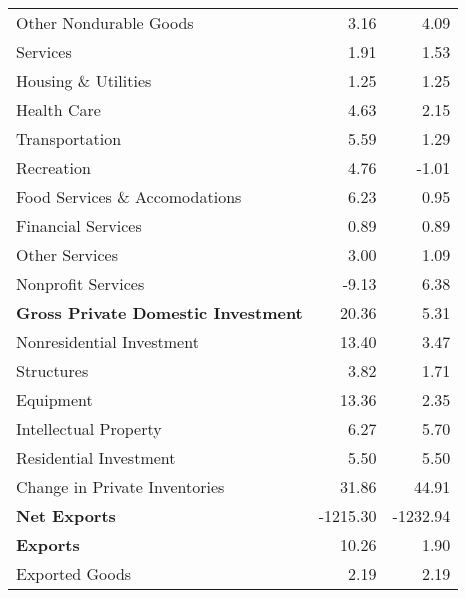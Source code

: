 \documentclass[11pt, letterpaper]{article}\usepackage[]{graphicx}\usepackage[]{color}
\begin{document}
\begin{table}[H]
\begin{tabular}{lrr}
  \hspace{24mm}  Other Nondurable Goods & 3.16 & 4.09 \\ 
  \hspace{8mm}  Services & 1.91 & 1.53 \\ 
  \hspace{16mm}  Housing \& Utilities & 1.25 & 1.25 \\ 
  \hspace{16mm}  Health Care & 4.63 & 2.15 \\ 
  \hspace{16mm}  Transportation & 5.59 & 1.29 \\ 
  \hspace{16mm}  Recreation & 4.76 & -1.01 \\ 
  \hspace{16mm}  Food Services \& Accomodations & 6.23 & 0.95 \\ 
  \hspace{16mm}  Financial Services & 0.89 & 0.89 \\ 
  \hspace{16mm}  Other Services & 3.00 & 1.09 \\ 
  \hspace{16mm}  Nonprofit Services & -9.13 & 6.38 \\ 
  \hspace{0mm} \textbf{Gross Private Domestic Investment} & 20.36 & 5.31 \\ 
  \hspace{8mm}  Nonresidential Investment & 13.40 & 3.47 \\ 
  \hspace{16mm}  Structures & 3.82 & 1.71 \\ 
  \hspace{16mm}  Equipment & 13.36 & 2.35 \\ 
  \hspace{16mm}  Intellectual Property & 6.27 & 5.70 \\ 
  \hspace{8mm}  Residential Investment & 5.50 & 5.50 \\ 
  \hspace{8mm}  Change in Private Inventories & 31.86 & 44.91 \\ 
  \hspace{0mm} \textbf{Net Exports} & -1215.30 & -1232.94 \\ 
  \hspace{0mm} \textbf{Exports} & 10.26 & 1.90 \\ 
  \hspace{8mm}  Exported Goods & 2.19 & 2.19 \\ 

\end{tabular}
\end{table}
\end{document}
